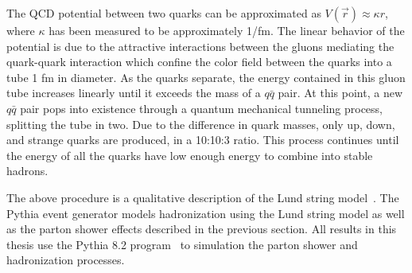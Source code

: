 The QCD potential between two quarks can be approximated as $ V(\vec r) \approx \kappa r$, where $\kappa$ has been measured to be approximately 1\unit{\GeVns/fm}.
The linear behavior of the potential is due to the attractive interactions between the gluons mediating the quark-quark interaction which confine the color field between the quarks into a tube 1 fm in diameter.
As the quarks separate, the energy contained in this gluon tube increases linearly until it exceeds the mass of a $q\bar q$ pair.
At this point, a new $q \bar q$ pair pops into existence through a quantum mechanical tunneling process, splitting the tube in two.
Due to the difference in quark masses, only up, down, and strange quarks are produced, in a 10:10:3 ratio.
This process continues until the energy of all the quarks have low enough energy to combine into stable hadrons.

The above procedure is a qualitative description of the Lund string model~\cite{Anderson1983}.
The Pythia event generator models hadronization using the Lund string model as well as the parton shower effects described in the previous section.
All results in this thesis use the Pythia 8.2 program~\cite{Sjostrand2015} to simulation the parton shower and hadronization processes. 

